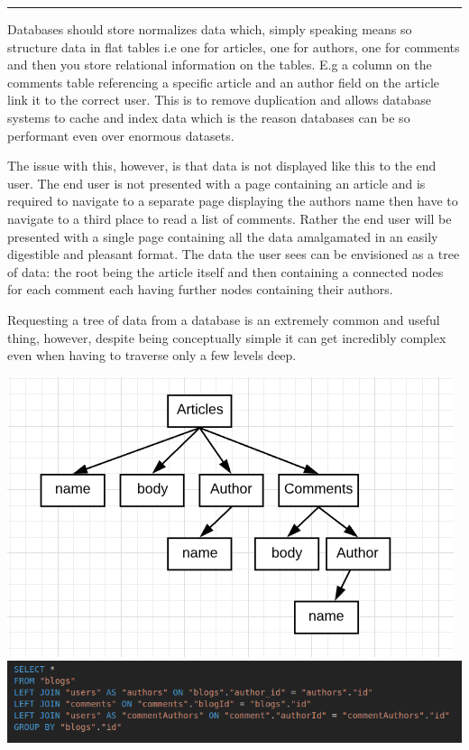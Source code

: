 \documentclass[
  12pt,
]{article}
\begin{document}
\begin{center}\rule{0.5\linewidth}{\linethickness}\end{center}

Databases should store normalizes data which, simply speaking means so
structure data in flat tables i.e one for articles, one for authors, one
for comments and then you store relational information on the tables.
E.g a column on the comments table referencing a specific article and an
author field on the article link it to the correct user. This is to
remove duplication and allows database systems to cache and index data
which is the reason databases can be so performant even over enormous
datasets.

The issue with this, however, is that data is not displayed like this to
the end user. The end user is not presented with a page containing an
article and is required to navigate to a separate page displaying the
authors name then have to navigate to a third place to read a list of
comments. Rather the end user will be presented with a single page
containing all the data amalgamated in an easily digestible and pleasant
format. The data the user sees can be envisioned as a tree of data: the
root being the article itself and then containing a connected nodes for
each comment each having further nodes containing their authors.

Requesting a tree of data from a database is an extremely common and
useful thing, however, despite being conceptually simple it can get
incredibly complex even when having to traverse only a few levels deep.

\includegraphics{./images/tree-diagram.png}
\includegraphics{./images/tree-with-joins.png}
\end{document}
